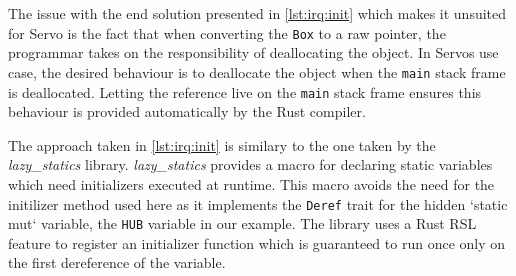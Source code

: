 The issue with the end solution presented in \autoref{lst:irq:init} which makes it unsuited for Servo is the fact that when converting the \texttt{Box} to a raw pointer, the programmar takes on the responsibility of deallocating the object.
In Servos use case, the desired behaviour is to deallocate the object when the \texttt{main} stack frame is deallocated.
Letting the reference live on the \texttt{main} stack frame ensures this behaviour is provided automatically by the Rust compiler.

The approach taken in \autoref{lst:irq:init} is similary to the one taken by the \textit{lazy\_statics} \cite{web:lazy_statics} library.
\textit{lazy\_statics} provides a macro for declaring static variables which need initializers executed at runtime.
This macro avoids the need for the initilizer method used here as it implements the \texttt{Deref} trait for the hidden `static mut` variable, the \texttt{HUB} variable in our example.
The library uses a Rust RSL feature to register an initializer function which is guaranteed to run once only on the first dereference of the variable.
